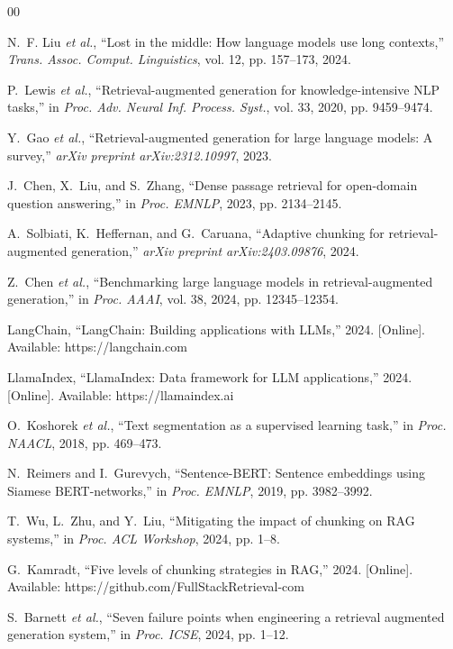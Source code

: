 \documentclass{ieeeaccess}
\begin{document}
\begin{thebibliography}{00}

 N.~F. Liu \emph{et al.}, ``Lost in the middle: How language models use long contexts,'' \emph{Trans. Assoc. Comput. Linguistics}, vol. 12, pp. 157--173, 2024.

 P.~Lewis \emph{et al.}, ``Retrieval-augmented generation for knowledge-intensive NLP tasks,'' in \emph{Proc. Adv. Neural Inf. Process. Syst.}, vol. 33, 2020, pp. 9459--9474.

 Y.~Gao \emph{et al.}, ``Retrieval-augmented generation for large language models: A survey,'' \emph{arXiv preprint arXiv:2312.10997}, 2023.

 J.~Chen, X.~Liu, and S.~Zhang, ``Dense passage retrieval for open-domain question answering,'' in \emph{Proc. EMNLP}, 2023, pp. 2134--2145.

 A.~Solbiati, K.~Heffernan, and G.~Caruana, ``Adaptive chunking for retrieval-augmented generation,'' \emph{arXiv preprint arXiv:2403.09876}, 2024.

 Z.~Chen \emph{et al.}, ``Benchmarking large language models in retrieval-augmented generation,'' in \emph{Proc. AAAI}, vol. 38, 2024, pp. 12345--12354.

 LangChain, ``LangChain: Building applications with LLMs,'' 2024. [Online]. Available: https://langchain.com

 LlamaIndex, ``LlamaIndex: Data framework for LLM applications,'' 2024. [Online]. Available: https://llamaindex.ai

 O.~Koshorek \emph{et al.}, ``Text segmentation as a supervised learning task,'' in \emph{Proc. NAACL}, 2018, pp. 469--473.

 N.~Reimers and I.~Gurevych, ``Sentence-BERT: Sentence embeddings using Siamese BERT-networks,'' in \emph{Proc. EMNLP}, 2019, pp. 3982--3992.

 T.~Wu, L.~Zhu, and Y.~Liu, ``Mitigating the impact of chunking on RAG systems,'' in \emph{Proc. ACL Workshop}, 2024, pp. 1--8.

 G.~Kamradt, ``Five levels of chunking strategies in RAG,'' 2024. [Online]. Available: https://github.com/FullStackRetrieval-com

 S.~Barnett \emph{et al.}, ``Seven failure points when engineering a retrieval augmented generation system,'' in \emph{Proc. ICSE}, 2024, pp. 1--12.


\end{thebibliography}
\end{document}
